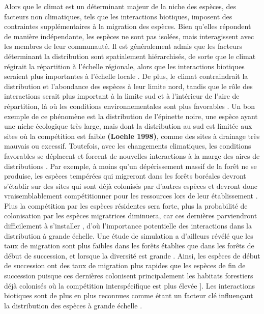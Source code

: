 Alors que le climat est un déterminant majeur de la niche des espèces,
des facteurs non climatiques, tels que les interactions biotiques,
imposent des contraintes supplémentaires à la migration des espèces.
Bien qu'elles répondent de manière indépendante, les espèces ne sont pas
isolées, mais interagissent avec les membres de leur communauté. Il est
généralement admis que les facteurs déterminant la distribution sont
spatialement hiérarchisés, de sorte que le climat régirait la
répartition à l'échelle régionale, alors que les interactions biotiques
seraient plus importantes à l'échelle locale
\citep{soberon_grinnellian_2007}. De plus, le climat contraindrait la
distribution et l'abondance des espèces à leur limite nord, tandis que
le rôle des interactions serait plus important à la limite sud et à
l'intérieur de l'aire de répartition, là où les conditions
environnementales sont plus favorables \citep{louthan_where_2015}. Un
bon exemple de ce phénomène est la distribution de l'épinette noire, une
espèce ayant une niche écologique très large, mais dont la distribution
au sud est limitée aux sites où la compétition est faible
\textbf{(Loehle 1998)}, comme des sites à drainage très mauvais ou
excessif. Toutefois, avec les changements climatiques, les conditions
favorables se déplacent et forcent de nouvelles interactions à la marge
des aires de distributions \citep{kissling_multispecies_2015}. Par
exemple, à moins qu'un dépérissement massif de la forêt ne se produise,
les espèces tempérées qui migreront dans les forêts boréales devront
s'établir sur des sites qui sont déjà colonisés par d'autres espèces et
devront donc vraisemblablement compétitionner pour les ressources lors
de leur établissement \citep[phénomène appelé l'effet
prioritaire;][]{gilman_framework_2010}. Plus la compétition par les
espèces résidentes sera forte, plus la probabilité de colonisation par
les espèces migratrices diminuera, car ces dernières parviendront
difficilement à s'installer \citep{cazelles_integration_2016}, d'où
l'importance potentielle des interactions dans la distribution à grande
échelle. Une étude de simulation a d'ailleurs révélé que les taux de
migration sont plus faibles dans les forêts établies que dans les forêts
de début de succession, et lorsque la diversité est grande
\citep{meier_climate_2012}. Ainsi, les espèces de début de succession
ont des taux de migration plus rapides que les espèces de fin de
succession puisque ces dernières colonisent principalement les habitats
forestiers déjà colonisés où la compétition interspécifique est plus
élevée \citet{meier_climate_2012}{]}. Les interactions biotiques sont de
plus en plus reconnues comme étant un facteur clé influençant la
distribution des espèces à grande échelle
\citep{meier_biotic_2010, blois_climate_2013, wisz_role_2013, svenning_influence_2014, cazelles_theory_2016}.

